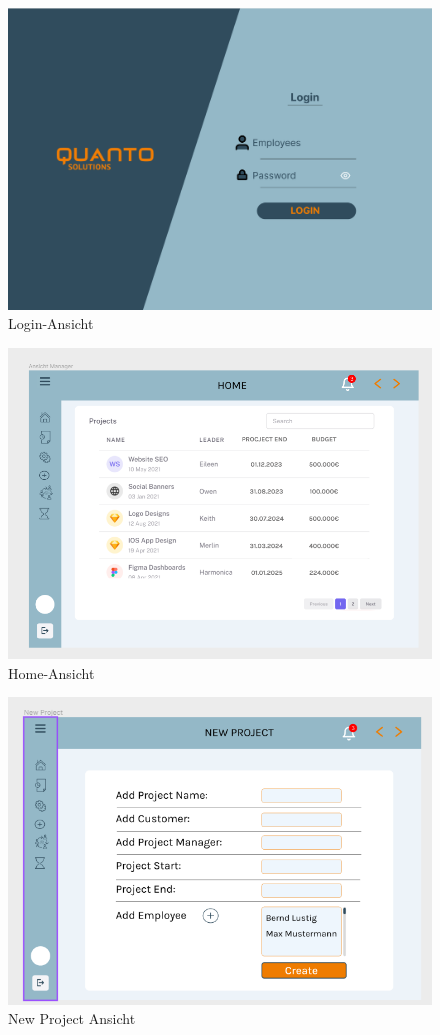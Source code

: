 \documentclass{article}
\begin{document}
        \begin{figure}[h]
            \includegraphics[height= 0.5\textwidth,width= \textwidth]{images/Login.png}
            \caption{Login-Ansicht}
            \label{fig:beispiel}
        \end{figure}
         \begin{figure}[h]
            \includegraphics[height= 0.5\textwidth,width= \textwidth]{images/Home.png}
            \caption{Home-Ansicht}
            \label{fig:beispiel}
        \end{figure}
        

\newpage
         \begin{figure}[h]
            \includegraphics[height= 0.5\textwidth,width= \textwidth]{images/New Project.png}
            \caption{New Project Ansicht}
            \label{fig:beispiel}
        \end{figure}
\end{document}
